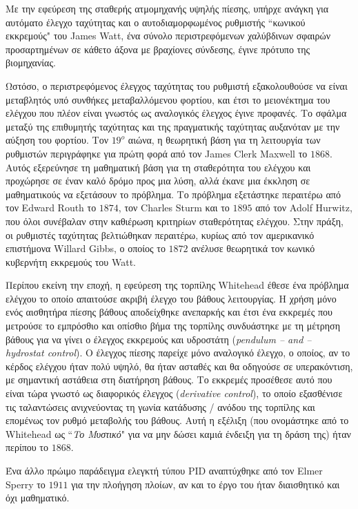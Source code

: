 Με την εφεύρεση της σταθερής ατμομηχανής υψηλής πίεσης, υπήρχε ανάγκη για αυτόματο έλεγχο ταχύτητας και ο αυτοδιαμορφωμένος ρυθμιστής ``κωνικού εκκρεμούς" του James Watt, ένα σύνολο περιστρεφόμενων χαλύβδινων σφαιρών προσαρτημένων σε κάθετο άξονα με βραχίονες σύνδεσης, έγινε πρότυπο της βιομηχανίας.

Ωστόσο, ο περιστρεφόμενος έλεγχος ταχύτητας του ρυθμιστή εξακολουθούσε να είναι μεταβλητός υπό συνθήκες μεταβαλλόμενου φορτίου, και έτσι το μειονέκτημα του ελέγχου που πλέον είναι γνωστός ως αναλογικός έλεγχος έγινε προφανές. Το σφάλμα μεταξύ της επιθυμητής ταχύτητας και της πραγματικής ταχύτητας αυξανόταν με την αύξηση του φορτίου. Τον $19^o$ αιώνα, η θεωρητική βάση για τη λειτουργία των ρυθμιστών περιγράφηκε για πρώτη φορά από τον James Clerk Maxwell το $1868$. Αυτός εξερεύνησε τη μαθηματική βάση για τη σταθερότητα του ελέγχου και προχώρησε σε έναν καλό δρόμο προς μια λύση, αλλά έκανε μια έκκληση σε μαθηματικούς να εξετάσουν το πρόβλημα.
Το πρόβλημα εξετάστηκε περαιτέρω από τον Edward Routh το $1874$, τον Charles Sturm και το $1895$ από τον Adolf Hurwitz, που όλοι συνέβαλαν στην καθιέρωση κριτηρίων σταθερότητας ελέγχου.
Στην πράξη, οι ρυθμιστές ταχύτητας βελτιώθηκαν περαιτέρω, κυρίως από τον αμερικανικό επιστήμονα Willard Gibbs, ο οποίος το $1872$ ανέλυσε θεωρητικά τον κωνικό κυβερνήτη εκκρεμούς του Watt.

Περίπου εκείνη την εποχή, η εφεύρεση της τορπίλης Whitehead έθεσε ένα πρόβλημα ελέγχου το οποίο απαιτούσε ακριβή έλεγχο του βάθους λειτουργίας. Η χρήση μόνο ενός αισθητήρα πίεσης βάθους αποδείχθηκε ανεπαρκής και έτσι ένα εκκρεμές που μετρούσε το εμπρόσθιο και οπίσθιο βήμα της τορπίλης συνδυάστηκε με τη μέτρηση βάθους για να γίνει ο έλεγχος εκκρεμούς και υδροστάτη (\emph{pendulum -- and -- hydrostat control}). Ο έλεγχος πίεσης παρείχε μόνο αναλογικό έλεγχο, ο οποίος, αν το κέρδος ελέγχου ήταν πολύ υψηλό, θα ήταν ασταθές και θα οδηγούσε σε υπερακόντιση, με σημαντική αστάθεια στη διατήρηση βάθους. Το εκκρεμές προσέθεσε αυτό που είναι τώρα γνωστό ως διαφορικός έλεγχος (\emph{derivative control}), το οποίο εξασθένισε τις ταλαντώσεις ανιχνεύοντας τη γωνία κατάδυσης / ανόδου της τορπίλης και επομένως τον ρυθμό μεταβολής του βάθους.
Αυτή η εξέλιξη (που ονομάστηκε από το Whitehead ως ``\emph{Το Μυστικό}" για να μην δώσει καμιά ένδειξη για τη δράση της) ήταν περίπου το $1868$.%

Ένα άλλο πρώιμο παράδειγμα ελεγκτή τύπου PID αναπτύχθηκε από τον Elmer Sperry το $1911$ για την πλοήγηση πλοίων, αν και το έργο του ήταν διαισθητικό και όχι μαθηματικό.%

